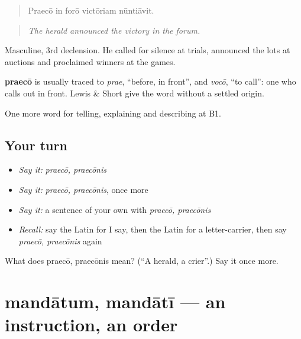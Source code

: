 \begin{quote}
Praecō in forō victōriam nūntiāvit.
\end{quote}

\begin{quote}
\emph{The herald announced the victory in the forum.}
\end{quote}

Masculine, 3rd declension. He called for silence at trials, announced the lots at auctions and proclaimed winners at the games.

\begin{cousinweb}
\textbf{praecō} is usually traced to \emph{prae}, \textquotedblleft{}before, in front\textquotedblright{}, and \emph{vocō}, \textquotedblleft{}to call\textquotedblright{}: one who calls out in front. Lewis \& Short give the word without a settled origin.
\end{cousinweb}

\begin{grammarlens}[title={What you've built}]
One more word for telling, explaining and describing at B1.
\end{grammarlens}

\subsection*{Your turn}
\begin{itemize}
\raggedright
  \item \emph{Say it:} \emph{praecō, praecōnis}
  \item \emph{Say it:} \emph{praecō, praecōnis}, once more
  \item \emph{Say it:} a sentence of your own with \emph{praecō, praecōnis}
  \item \emph{Recall:} say the Latin for I say, then the Latin for a letter-carrier, then say \emph{praecō, praecōnis} again
\end{itemize}

\begin{tcolorbox}[breakable,colback=teal!4,colframe=teal!35!black,title={Before you move on}]
What does praecō, praecōnis mean? (\textquotedblleft{}A herald, a crier\textquotedblright{}.) Say it once more.
\end{tcolorbox}
\section[mandātum, mandātī]{mandātum, mandātī — an instruction, an order}

